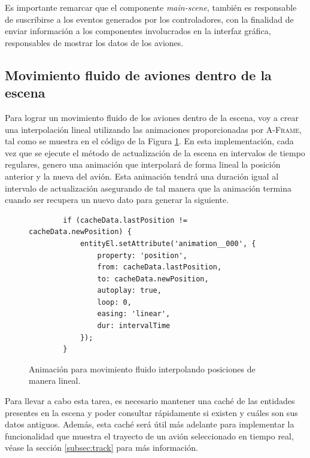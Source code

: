\documentclass[a4paper, 11pt]{book}
\begin{document}
Es importante remarcar que el componente \emph{main-scene}, también es responsable de suscribirse a los eventos generados por los controladores, con la finalidad de enviar información a los componentes involucrados en la interfaz gráfica, responsables de mostrar los datos de los aviones.
\subsection{Movimiento fluido de aviones dentro de la escena}
\label{subsec:movimientoFluido}
Para lograr un movimiento fluido de los aviones dentro de la escena, voy a crear una interpolación lineal utilizando las animaciones proporcionadas por \textsc{A-Frame}, tal como se muestra en el código de la Figura \ref{codigo:movimientoFluido}. En esta implementación, cada vez que se ejecute el método de actualización de la escena en intervalos de tiempo regulares, genero una animación que interpolará de forma lineal la posición anterior y la nueva del avión. Esta animación tendrá una duración igual al intervalo de actualización asegurando de tal manera que la animación termina cuando ser recupera un nuevo dato para generar la siguiente.
\begin{figure}[h]
	\centering
	\begin{verbatim}
		if (cacheData.lastPosition != cacheData.newPosition) {
			entityEl.setAttribute('animation__000', {
				property: 'position',
				from: cacheData.lastPosition,
				to: cacheData.newPosition,
				autoplay: true,
				loop: 0,
				easing: 'linear',
				dur: intervalTime
			});
		}
	\end{verbatim}
	\caption{Animación para movimiento fluido interpolando posiciones de manera lineal.
		\label{codigo:movimientoFluido}}
\end{figure}

Para llevar a cabo esta tarea, es necesario mantener una caché de las entidades presentes en la escena y poder consultar rápidamente si existen y cuáles son sus datos antiguos. Además, esta caché será útil más adelante para implementar la funcionalidad que muestra el trayecto de un avión seleccionado en tiempo real, véase la sección \ref{subsec:track} para más información.
\end{document}
